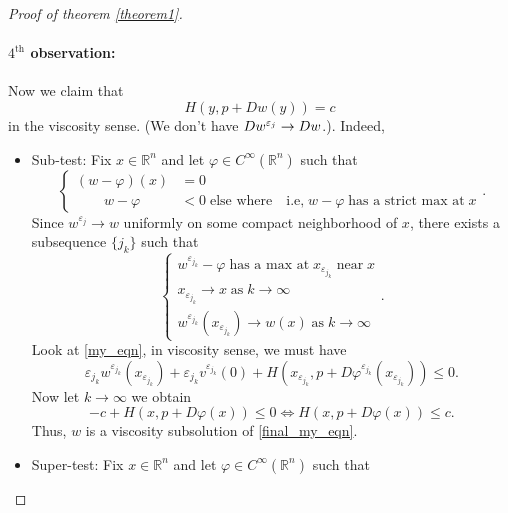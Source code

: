 \documentclass[12pt, oneside]{amsart}  	%
\begin{document}
\begin{proof}[Proof of theorem \ref{theorem1}]
\paragraph{\textbf{$4^{\text{th}}$ observation:}} Now we claim that
\begin{equation}\label{final_my_eqn}
H(y, p+ Dw(y))=c
\end{equation}
in the viscosity sense.
(We don't have $Dw^{\varepsilon_j}\to Dw$.). Indeed,
\begin{itemize}
\item Sub-test: Fix $x\in \mathbb{R}^n$ and let $\varphi\in C^\infty(\mathbb{R}^n)$ such that
\begin{equation*}
\begin{cases}
(w - \varphi)(x) &= 0\\
\qquad w - \varphi &<0 \;\text{else where}\quad \text{i.e,}\; w-\varphi\;\text{has a strict max at}\; x
\end{cases}.
\end{equation*}
Since $w^{\varepsilon_j}\longrightarrow w$ uniformly on some compact neighborhood of $x$, there exists a subsequence $\{j_k\}$ such that
\begin{equation*}
\begin{cases}
w^{\varepsilon_{j_k}} - \varphi \;\text{has a max at}\; x_{\varepsilon_{j_k}}\;\text{near}\;x\\
x_{\varepsilon_{j_k}} \longrightarrow x \;\text{as}\; k\longrightarrow\infty\\
w^{\varepsilon_{j_k}}\left(x_{\varepsilon_{j_k}}\right) \longrightarrow w(x) \;\text{as}\; k\longrightarrow\infty
\end{cases}.
\end{equation*}
Look at \eqref{my_eqn}, in viscosity sense, we must have
\begin{equation*}
\varepsilon_{j_k}
w^{\varepsilon_{j_k}}\left(x_{\varepsilon_{j_k}}\right) +
\varepsilon_{j_k} v^{\varepsilon_{j_k}}(0) +
H(x_{\varepsilon_{j_k}},p+ D\varphi^{\varepsilon_{j_k}}(x_{\varepsilon_{j_k}})) \leq 0.
\end{equation*}
Now let $k\longrightarrow \infty$ we obtain
\begin{equation*}
-c + H(x,p+D\varphi(x)) \leq 0 \Longleftrightarrow H(x,p+D\varphi(x)) \leq c.
\end{equation*}
Thus, $w$ is a viscosity subsolution of \eqref{final_my_eqn}.
\item Super-test: Fix $x\in \mathbb{R}^n$ and let $\varphi\in C^\infty(\mathbb{R}^n)$ such that
\begin{equation*}

\end{equation*}
\end{itemize}
\end{proof}
\end{document}
